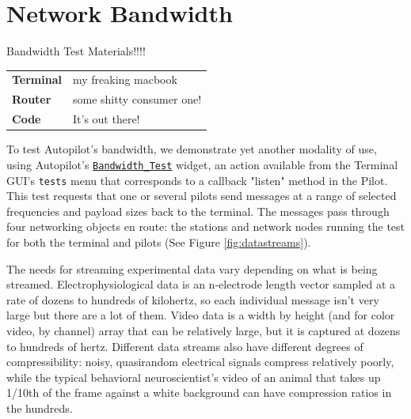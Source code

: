 \section{Network Bandwidth}
\label{sec:bandwidth}

\begin{margintable}[0cm]
\caption{Bandwidth Test Materials!!!!}
\label{tab:gpiomaterials}
\noindent\begin{tabularx}{\linewidth}{lX}%
\toprule
\textbf{Terminal} & my freaking macbook \\
\textbf{Router} & some shitty consumer one! \\
\textbf{Code} & It's out there! \\
\bottomrule
\end{tabularx}
\end{margintable}

To test Autopilot's bandwidth, we demonstrate yet another modality of use, using Autopilot's \href{https://docs.auto-pi-lot.com/en/v0.5.0/gui/menus.html#autopilot.gui.menus.tests.Bandwidth_Test}{\texttt{Bandwidth\_Test}} widget, an action available from the Terminal GUI's \texttt{tests} menu that corresponds to a callback "listen" method in the Pilot. This test requests that one or several pilots send messages at a range of selected frequencies and payload sizes back to the terminal. The messages pass through four networking objects en route: the stations and network nodes running the test for both the terminal and pilots (See Figure \ref{fig:datastreams}). 

The needs for streaming experimental data vary depending on what is being streamed. Electrophysiological data is an n-electrode length vector sampled at a rate of dozens to hundreds of kilohertz, so each individual message isn't very large but there are a lot of them. Video data is a width by height (and for color video, by channel) array that can be relatively large, but it is captured at dozens to hundreds of hertz. Different data streams also have different degrees of compressibility: noisy, quasirandom electrical signals compress relatively poorly, while the typical behavioral neuroscientist's video of an animal that takes up 1/10th of the frame against a white background can have compression ratios in the hundreds.


